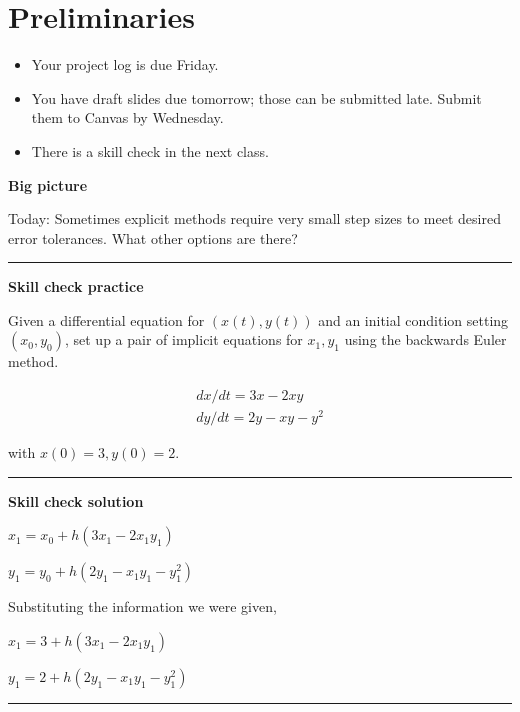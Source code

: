 \documentclass[12pt,letterpaper,noanswers]{exam}
\begin{document}
 \pdfpageheight 11in 
  \pdfpagewidth 8.5in

\noindent 

\section*{Preliminaries}

\begin{itemize}
\itemsep0pt
\item Your project log is due Friday.
\item You have draft slides due tomorrow; those can be submitted late.  Submit them to Canvas by Wednesday.
\item There is a skill check in the next class.
\end{itemize}


\noindent\textbf{Big picture}

Today: Sometimes explicit methods require very small step sizes to meet desired error tolerances.  What other options are there?

\vspace{0.2cm}
\hrule
\vspace{0.2cm}

\noindent \textbf{Skill check practice}

Given a differential equation for $(x(t),y(t))$ and an initial condition setting $(x_0,y_0)$, set up a pair of implicit equations for $x_1, y_1$ using the backwards Euler method.

\[\displaystyle\begin{array}{l} dx/dt = 3x - 2xy \\
dy/dt= 2y - xy - y^2 \end{array}\]

with $x(0) = 3, y(0) = 2$.

\vspace{0.2cm}
\hrule
\vspace{0.2cm}

\noindent \textbf{Skill check solution}

$x_1 = x_0 + h (3x_1 - 2x_1 y_1)$


$y_1 = y_0 + h (2y_1 - x_1 y_1 - y_1^2)$

Substituting the information we were given,

$x_1 = 3 + h (3x_1 - 2x_1 y_1)$


$y_1 = 2 + h (2y_1 - x_1 y_1 - y_1^2)$




\vspace{0.2cm}
\hrule
\vspace{0.2cm}
\end{document}
